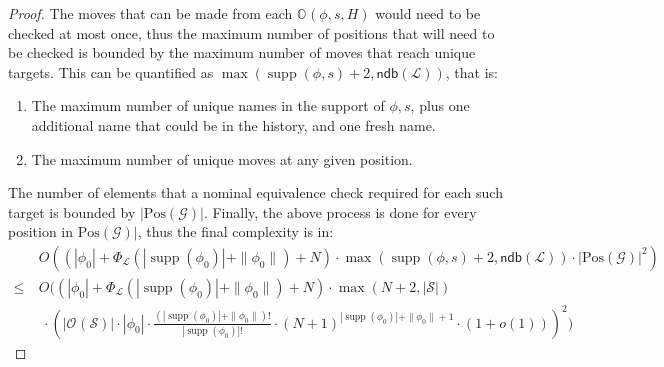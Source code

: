 \documentclass[10pt,a4paper]{article}
\theoremstyle{definition}
\theoremstyle{remark}
\newcommand\pos[0]{\mathrm{Pos}}
\DeclareMathOperator{\supp}{supp}
\newcommand\Gcal{\mathcal{G}}
\newcommand\Lcal{\mathcal{L}}
\newcommand\Scal{\mathcal{S}}
\newcommand\orb[1][]{\mathcal{O}_{#1}}
\newcommand\orbs[1][]{\mathbb{O}_{#1}}
\renewcommand\S{N}
\newcommand\ndbb[0]{\mathsf{ndb}}
\begin{document}
\begin{proof}
	The moves that can be made from each $\orbs(\phi, s, H)$ would need to be checked at most once, thus the maximum number of positions that will need to be checked is bounded by the maximum number of moves that reach unique targets.
	This can be quantified as $\max(\supp(\phi, s) + 2, \ndbb(\Lcal))$, that is:
	\begin{enumerate}
		\item The maximum number of unique names in the support of $\phi, s$, plus one additional name that could be in the history, and one fresh name.
		\item The maximum number of unique moves at any given position.
	\end{enumerate}
	The number of elements that a nominal equivalence check required for each such target is bounded by $|\pos(\Gcal)|$.
	Finally, the above process is done for every position in $\pos(\Gcal)|$, 
	 thus the final complexity is in:
	\begin{align*}
 		&O(
 		(|\phi_0| + \Phi_\Lcal(|\supp(\phi_0)| + \|\phi_0\|) + \S) 			\cdot
 			\max(\supp(\phi, s) + 2, \ndbb(\Lcal)
 		)\cdot |\pos(\Gcal)|^2)
 		\\
 		\le\ &O(
 		(|\phi_0| + \Phi_\Lcal(|\supp(\phi_0)| + \|\phi_0\|) + \S)
 		\cdot
 		\max(N + 2, |\Scal|
 		) \\&\ \cdot 
 		(|\orb(\Scal)| \cdot|\phi_0|\cdot \frac{(|\supp(\phi_0)|+\|\phi_0\|)!}{|\supp(\phi_0)|!}\cdot (\S + 1)^{|\supp(\phi_0)| + \|\phi_0\| + 1}\cdot(1+o(1)))
 		^2)
 	\end{align*}
 \end{proof}
\end{document}
